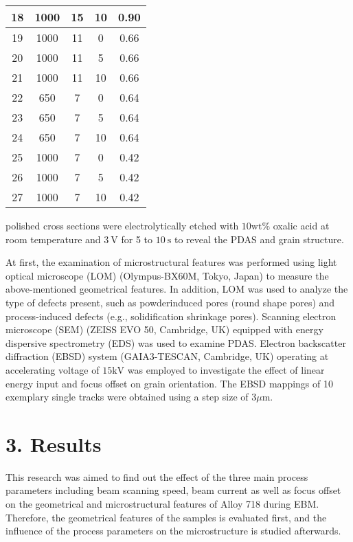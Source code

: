 \documentclass[10pt]{article}
\begin{document}
\begin{center}
\begin{tabular}{|c|c|c|c|c|}
\hline
18 & 1000 & 15 & 10 & 0.90 \\
\hline
19 & 1000 & 11 & 0 & 0.66 \\
\hline
20 & 1000 & 11 & 5 & 0.66 \\
\hline
21 & 1000 & 11 & 10 & 0.66 \\
\hline
22 & 650 & 7 & 0 & 0.64 \\
\hline
23 & 650 & 7 & 5 & 0.64 \\
\hline
24 & 650 & 7 & 10 & 0.64 \\
\hline
25 & 1000 & 7 & 0 & 0.42 \\
\hline
26 & 1000 & 7 & 5 & 0.42 \\
\hline
27 & 1000 & 7 & 10 & 0.42 \\
\hline
\end{tabular}
\end{center}

polished cross sections were electrolytically etched with $10 \mathrm{wt} \%$ oxalic acid at room temperature and $3 \mathrm{~V}$ for 5 to $10 \mathrm{~s}$ to reveal the PDAS and grain structure.

At first, the examination of microstructural features was performed using light optical microscope (LOM) (Olympus-BX60M, Tokyo, Japan) to measure the above-mentioned geometrical features. In addition, LOM was used to analyze the type of defects present, such as powderinduced pores (round shape pores) and process-induced defects (e.g., solidification shrinkage pores). Scanning electron microscope (SEM) (ZEISS EVO 50, Cambridge, UK) equipped with energy dispersive spectrometry (EDS) was used to examine PDAS. Electron backscatter diffraction (EBSD) system (GAIA3-TESCAN, Cambridge, UK) operating at accelerating voltage of $15 \mathrm{kV}$ was employed to investigate the effect of linear energy input and focus offset on grain orientation. The EBSD mappings of 10 exemplary single tracks were obtained using a step size of $3 \mu \mathrm{m}$.

\section*{3. Results}
This research was aimed to find out the effect of the three main process parameters including beam scanning speed, beam current as well as focus offset on the geometrical and microstructural features of Alloy 718 during EBM. Therefore, the geometrical features of the samples is evaluated first, and the influence of the process parameters on the microstructure is studied afterwards.
\end{document}
